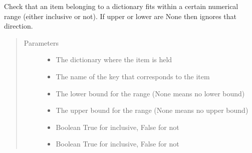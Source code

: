 \documentclass[letterpaper,10pt,english]{sphinxmanual}
\begin{document}

\begin{fulllineitems}
\label{\detokenize{source/yawning_titan.envs.generic.helpers:yawning_titan.envs.generic.helpers.environment_input_validation.check_within_range}}
\sphinxAtStartPar
Check that an item belonging to a dictionary fits within a certain numerical range (either inclusive or not). If upper or lower are None then ignores that direction.
\begin{quote}\begin{description}
\item[{Parameters}] \leavevmode\begin{itemize}
\item {}
\sphinxAtStartPar
{} \textendash{} The dictionary where the item is held

\item {}
\sphinxAtStartPar
{} \textendash{} The name of the key that corresponds to the item

\item {}
\sphinxAtStartPar
{} \textendash{} The lower bound for the range (None means no lower bound)

\item {}
\sphinxAtStartPar
{} \textendash{} The upper bound for the range (None means no upper bound)

\item {}
\sphinxAtStartPar
{} \textendash{} Boolean \sphinxhyphen{} True for inclusive, False for not

\item {}
\sphinxAtStartPar
{} \textendash{} Boolean \sphinxhyphen{} True for inclusive, False for not

\end{itemize}

\end{description}\end{quote}

\end{fulllineitems}
\end{document}
